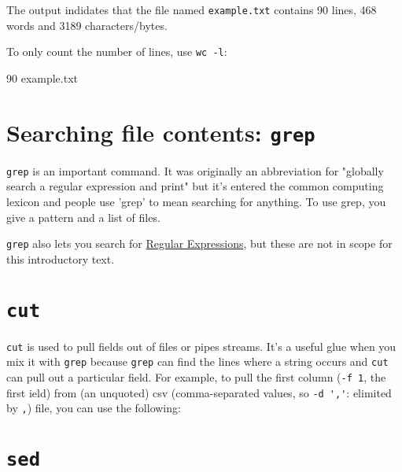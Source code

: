 The output indidates that the file named \verb|example.txt| contains 90 lines, 468 words and 3189 characters/bytes.

To only count the number of lines, use \verb|wc -l|:

\begin{prompt}
      90    example.txt
\end{prompt}

\section{Searching file contents: \texttt{grep}}

\verb|grep| is an important command. It was originally an abbreviation for
"globally search a regular expression and print" but it's entered the common
computing lexicon and people use 'grep' to mean searching for anything. To use
grep, you give a pattern and a list of files.

\begin{prompt}
\end{prompt}

\verb|grep| also lets you search for
\href{https://en.wikipedia.org/wiki/Regular_expression}{Regular Expressions}, but
these are not in scope for this introductory text.

\section{\texttt{cut}}

\verb|cut| is used to pull fields out of files or pipes streams.
It's a useful glue when you mix it with \verb|grep| because \verb|grep| can find the
lines where a string occurs and \verb|cut| can pull out a particular field. For
example, to pull the first column (\verb|-f 1|, the first ield)
from (an unquoted) csv (comma-separated values, so \verb|-d ','|: elimited by \verb|,|)
file, you can use the following:

\begin{prompt}
\end{prompt}

\section{\texttt{sed}}

